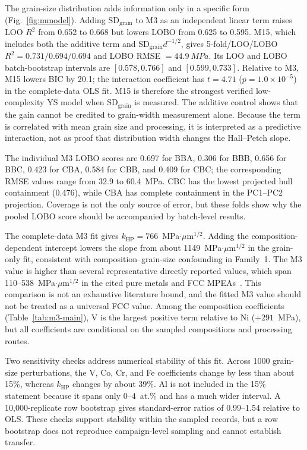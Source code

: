 \documentclass[5p,times,twocolumn]{elsarticle}
\begin{document}
The grain-size distribution adds information only in a specific form (Fig.~\ref{fig:mmodel}). Adding $\mathrm{SD}_{\mathrm{grain}}$ to M3 as an independent linear term raises LOO $R^2$ from 0.652 to 0.668 but lowers LOBO from 0.625 to 0.595. M15, which includes both the additive term and $\mathrm{SD}_{\mathrm{grain}}d^{-1/2}$, gives 5-fold/LOO/LOBO $R^2=0.731/0.694/0.694$ and LOBO RMSE $=\SI{44.9}{MPa}$. Its LOO and LOBO batch-bootstrap intervals are $[0.578,0.766]$ and $[0.599,0.733]$. Relative to M3, M15 lowers BIC by 20.1; the interaction coefficient has $t=4.71$ ($p=1.0\times10^{-5}$) in the complete-data OLS fit. M15 is therefore the strongest verified low-complexity YS model when $\mathrm{SD}_{\mathrm{grain}}$ is measured. The additive control shows that the gain cannot be credited to grain-width measurement alone. Because the term is correlated with mean grain size and processing, it is interpreted as a predictive interaction, not as proof that distribution width changes the Hall--Petch slope.

The individual M3 LOBO scores are 0.697 for BBA, 0.306 for BBB, 0.656 for BBC, 0.423 for CBA, 0.584 for CBB, and 0.409 for CBC; the corresponding RMSE values range from 32.9 to \SI{60.4}{MPa}. CBC has the lowest projected hull containment (0.476), while CBA has complete containment in the PC1--PC2 projection. Coverage is not the only source of error, but these folds show why the pooled LOBO score should be accompanied by batch-level results.

The complete-data M3 fit gives $k_{\mathrm{HP}}=766$~MPa$\cdot\mu$m$^{1/2}$. Adding the composition-dependent intercept lowers the slope from about 1149~MPa$\cdot\mu$m$^{1/2}$ in the grain-only fit, consistent with composition--grain-size confounding in Family~1. The M3 value is higher than several representative directly reported values, which span 110--538~MPa$\cdot\mu$m$^{1/2}$ in the cited pure metals and FCC MPEAs~\cite{Cordero2016,Yoshida2017,Otto2013,Yoshida2019acta}. This comparison is not an exhaustive literature bound, and the fitted M3 value should not be treated as a universal FCC value. Among the composition coefficients (Table~\ref{tab:m3-main}), V is the largest positive term relative to Ni ($+291$~MPa), but all coefficients are conditional on the sampled compositions and processing routes.

Two sensitivity checks address numerical stability of this fit. Across 1000 grain-size perturbations, the V, Co, Cr, and Fe coefficients change by less than about 15\%, whereas $k_{\mathrm{HP}}$ changes by about 39\%. Al is not included in the 15\% statement because it spans only 0--4~at.\% and has a much wider interval. A 10,000-replicate row bootstrap gives standard-error ratios of 0.99--1.54 relative to OLS. These checks support stability within the sampled records, but a row bootstrap does not reproduce campaign-level sampling and cannot establish transfer.
\end{document}
